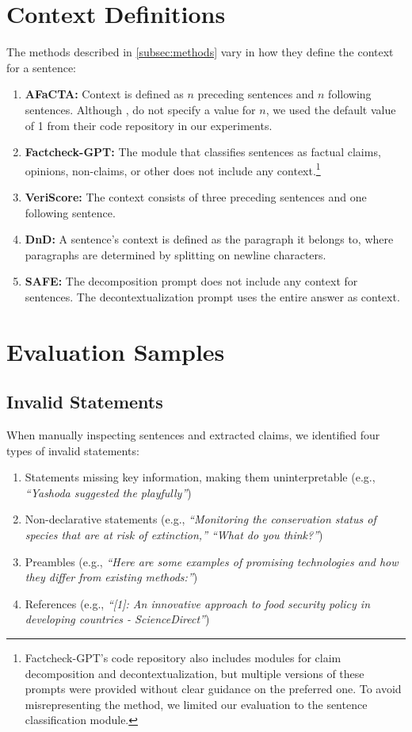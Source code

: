 \section{Context Definitions}
\label{app:method_contexts}
The methods described in \autoref{subsec:methods} vary in how they define the context for a sentence:
\begin{enumerate}
    \item \textbf{AFaCTA:} Context is defined as $n$ preceding sentences and $n$ following sentences. Although \citet{ni:2024}, do not specify a value for $n$, we used the default value of 1 from their code repository in our experiments.
    \item \textbf{Factcheck-GPT:} The module that classifies sentences as factual claims, opinions, non-claims, or other does not include any context.\footnote{Factcheck-GPT’s code repository also includes modules for claim decomposition and decontextualization, but multiple versions of these prompts were provided without clear guidance on the preferred one. To avoid misrepresenting the method, we limited our evaluation to the sentence classification module.}
    \item \textbf{VeriScore:} The context consists of three preceding sentences and one following sentence.
    \item \textbf{DnD:} A sentence’s context is defined as the paragraph it belongs to, where paragraphs are determined by splitting on newline characters.
    \item \textbf{SAFE:} The decomposition prompt does not include any context for sentences. The decontextualization prompt uses the entire answer as context.
\end{enumerate}

\section{Evaluation Samples}
\label{app:exp_samples}

\subsection{Invalid Statements}
\label{app:invalid_statements}
When manually inspecting sentences and extracted claims, we identified four types of invalid statements:
\begin{enumerate}
    \item Statements missing key information, making them uninterpretable (e.g., \textit{``Yashoda suggested the playfully''})
    \item Non-declarative statements (e.g., \textit{``Monitoring the conservation status of species that are at risk of extinction,'' ``What do you think?''}) 
    \item Preambles (e.g., \textit{``Here are some examples of promising technologies and how they differ from existing methods:''})
    \item References (e.g., \textit{``[1]: An innovative approach to food security policy in developing countries - ScienceDirect''})
\end{enumerate}

